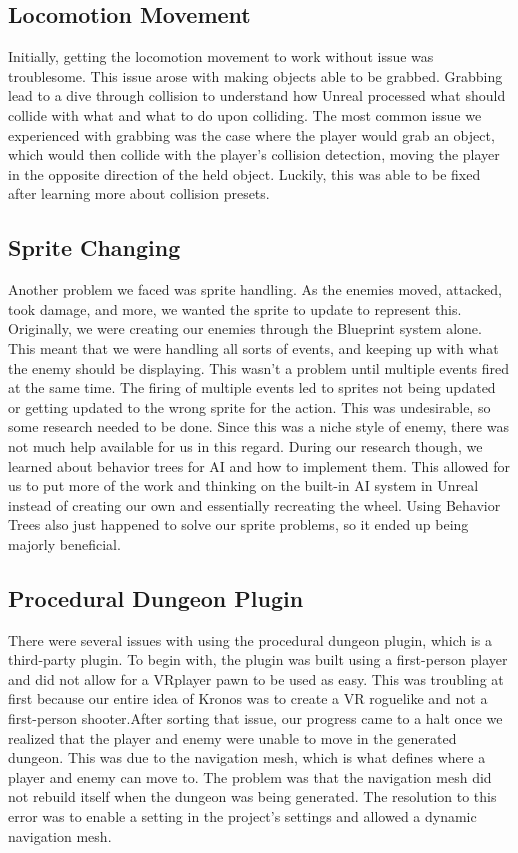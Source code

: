 \documentclass{sigchi}
\begin{document}
\subsection*{Locomotion Movement}
Initially, getting the locomotion movement to work without issue was troublesome. This issue arose with making objects able to be grabbed. Grabbing lead to a dive through collision to understand how Unreal processed what should collide with what and what to do upon colliding. The most common issue we experienced with grabbing was the case where the player would grab an object, which would then collide with the player's collision detection, moving the player in the opposite direction of the held object. Luckily, this was able to be fixed after learning more about collision presets.
\subsection*{Sprite Changing}
Another problem we faced was sprite handling. As the enemies moved, attacked, took damage, and more, we wanted the sprite to update to represent this. Originally, we were creating our enemies through the Blueprint system alone. This meant that we were handling all sorts of events, and keeping up with what the enemy should be displaying. This wasn't a problem until multiple events fired at the same time. The firing of multiple events led to sprites not being updated or getting updated to the wrong sprite for the action. This was undesirable, so some research needed to be done. Since this was a niche style of enemy, there was not much help available for us in this regard. During our research though, we learned about behavior trees for AI and how to implement them. This allowed for us to put more of the work and thinking on the built-in AI system in Unreal instead of creating our own and essentially recreating the wheel. Using Behavior Trees also just happened to solve our sprite problems, so it ended up being majorly beneficial.
\subsection*{Procedural Dungeon Plugin}
There were several issues with using the procedural dungeon plugin, which is a third-party plugin. To begin with, the plugin was built using a first-person player and did not allow for a VRplayer pawn to be used as easy. This was troubling at first because our entire idea of Kronos was to create a VR roguelike and not a first-person shooter.After sorting that issue, our progress came to a halt once we realized that the player and enemy were unable to move in the generated dungeon.  This was due to the navigation mesh, which is what defines where a player and enemy can move to. The problem was that the navigation mesh did not rebuild itself when the dungeon was being generated. The resolution to this error was to enable a setting in the project's settings and allowed a dynamic navigation mesh.
\end{document}
